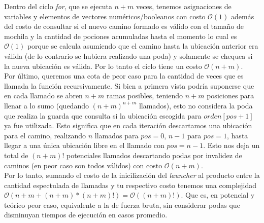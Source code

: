     Dentro del ciclo \emph{for}, que se ejecuta $n+m$ veces, tenemos asignaciones de variables y elementos de vectores numéricos/booleanos con costo $\mathcal{O}(1)$ además del costo de consultar si el nuevo camino formado es válido con el tamaño de mochila y la cantidad de pociones acumuladas hasta el momento lo cual es $\mathcal{O}(1)$ porque se calcula asumiendo que el camino hasta la ubicación anterior era válida (de lo contrario se hubiera realizado una poda) y solamente se chequea si la nueva ubicación es válida. Por lo tanto el ciclo tiene un costo $\mathcal{O}(n+m)$.
    \\

    Por último, queremos una cota de peor caso para la cantidad de veces que es llamada la función recursivamente. Si bien a primera vista podría suponerse que en cada llamado se abren $n+m$ ramas posibles, teniendo $n+m$ posiciones para llenar a lo sumo (quedando $(n+m)^{n+m}$ llamados), esto no considera la poda que realiza la guarda que consulta si la ubicación escogida para $orden[pos+1]$ ya fue utilizada. Esto significa que en cada iteración descartamos una ubicación para el camino, realizando $n$ llamados para $pos=0$, $n-1$ para $pos=1$, hasta llegar a una única ubicación libre en el llamado con $pos=n-1$. Esto nos deja un total de $(n+m)!$ potenciales llamados descartando podas por invalidez de caminos (en peor caso son todos válidos) con costo $\mathcal{O}(n+m)$.
    \\

    Por lo tanto, sumando el costo de la inicilización del \emph{launcher} al producto entre la cantidad espectulada de llamadas y tu respectivo costo tenemos una complejidad $\mathcal{O}(n+m + (n+m)*(n+m)!) = \mathcal{O}((n+m)!)$. Que es, en potencial y teórico peor caso, equivalente a la de fuerza bruta, sin considerar podas que disminuyan tiempos de ejecución en casos promedio.
